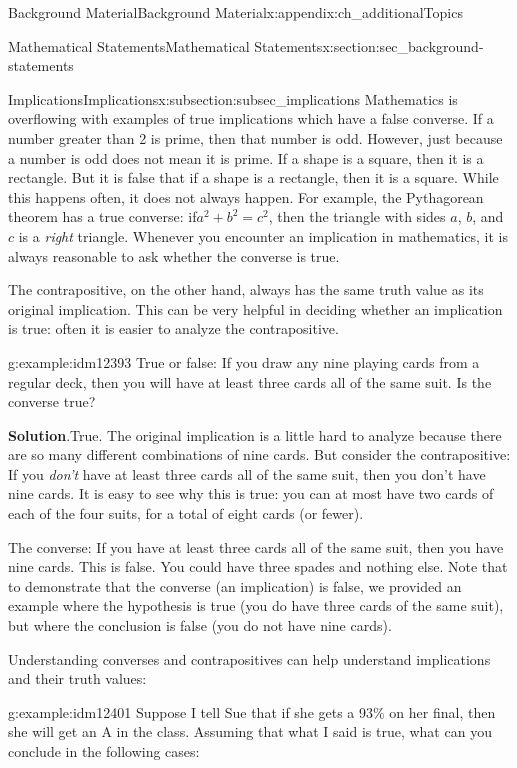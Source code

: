 \documentclass[oneside,10pt,]{book}
\numberwithin{equation}{chapter}
\begin{document}
\begin{appendixptx}{Background Material}{}{Background Material}{}{}{x:appendix:ch_additionalTopics}
\begin{sectionptx}{Mathematical Statements}{}{Mathematical Statements}{}{}{x:section:sec_background-statements}
\begin{subsectionptx}{Implications}{}{Implications}{}{}{x:subsection:subsec_implications}
Mathematics is overflowing with examples of true implications which have a false converse. If a number greater than 2 is prime, then that number is odd. However, just because a number is odd does not mean it is prime. If a shape is a square, then it is a rectangle. But it is false that if a shape is a rectangle, then it is a square. While this happens often, it does not always happen. For example, the Pythagorean theorem has a true converse: if\(a^2 + b^2 = c^2\), then the triangle with sides \(a\), \(b\), and \(c\) is a \emph{right} triangle. Whenever you encounter an implication in mathematics, it is always reasonable to ask whether the converse is true.%
\par
The contrapositive, on the other hand, always has the same truth value as its original implication. This can be very helpful in deciding whether an implication is true: often it is easier to analyze the contrapositive.%
\begin{example}{}{g:example:idm12393}%
True or false: If you draw any nine playing cards from a regular deck, then you will have at least three cards all of the same suit. Is the converse true?%
\par\smallskip%
\noindent\textbf{Solution}.\hypertarget{g:solution:idm12396}{}\quad{}True. The original implication is a little hard to analyze because there are so many different combinations of nine cards. But consider the contrapositive: If you \emph{don't} have at least three cards all of the same suit, then you don't have nine cards. It is easy to see why this is true: you can at most have two cards of each of the four suits, for a total of eight cards (or fewer).%
\par
The converse: If you have at least three cards all of the same suit, then you have nine cards. This is false. You could have three spades and nothing else. Note that to demonstrate that the converse (an implication) is false, we provided an example where the hypothesis is true (you do have three cards of the same suit), but where the conclusion is false (you do not have nine cards).%
\end{example}
Understanding converses and contrapositives can help understand implications and their truth values:%
\begin{example}{}{g:example:idm12401}%
Suppose I tell Sue that if she gets a 93\% on her final, then she will get an A in the class. Assuming that what I said is true, what can you conclude in the following cases:%
\par
%
\begin{enumerate}

\end{enumerate}
\end{example}
\end{subsectionptx}
\end{sectionptx}
\end{appendixptx}
\end{document}
